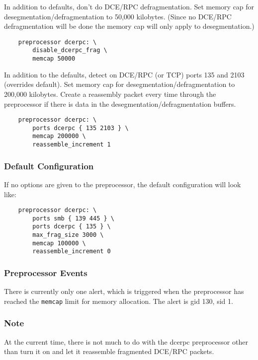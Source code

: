 \documentclass[english]{report}
\begin{document}
In addition to defaults, don't do DCE/RPC defragmentation.  Set memory cap for
desegmentation/defragmentation to 50,000 kilobytes.  (Since no DCE/RPC
defragmentation will be done the memory cap will only apply to desegmentation.)

\begin{verbatim}
    preprocessor dcerpc: \
        disable_dcerpc_frag \
        memcap 50000
\end{verbatim}

In addition to the defaults, detect on DCE/RPC (or TCP) ports 135 and 2103
(overrides default).  Set memory cap for desegmentation/defragmentation to
200,000 kilobytes.  Create a reassembly packet every time through the
preprocessor if there is data in the desegmentation/defragmentation buffers.

\begin{verbatim}
    preprocessor dcerpc: \
        ports dcerpc { 135 2103 } \
        memcap 200000 \
        reassemble_increment 1
\end{verbatim}

\subsubsection{Default Configuration}

If no options are given to the preprocessor, the default configuration will
look like:

\begin{verbatim}
    preprocessor dcerpc: \
        ports smb { 139 445 } \
        ports dcerpc { 135 } \
        max_frag_size 3000 \
        memcap 100000 \
        reassemble_increment 0
\end{verbatim}

\subsubsection{Preprocessor Events}

There is currently only one alert, which is triggered when the preprocessor has
reached the \texttt{memcap} limit for memory allocation.  The alert is gid 130,
sid 1.

\subsubsection{Note}

At the current time, there is not much to do with the dcerpc preprocessor other
than turn it on and let it reassemble fragmented DCE/RPC packets.
\end{document}
